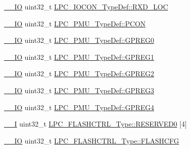 \begin{DoxyCompactItemize}
\item 
\hyperlink{group___c_m_s_i_s__core__definitions_gaec43007d9998a0a0e01faede4133d6be}{\+\_\+\+\_\+\+IO} uint32\+\_\+t \hyperlink{group___l_p_c11xx___definitions_ga8ec4275fda741de5194ccd27dcb0cb22}{L\+P\+C\+\_\+\+I\+O\+C\+O\+N\+\_\+\+Type\+Def\+::\+R\+X\+D\+\_\+\+L\+OC}
\item 
\hyperlink{group___c_m_s_i_s__core__definitions_gaec43007d9998a0a0e01faede4133d6be}{\+\_\+\+\_\+\+IO} uint32\+\_\+t \hyperlink{group___l_p_c11xx___definitions_gace88fd565967e0b8a698ed05aa6a08f9}{L\+P\+C\+\_\+\+P\+M\+U\+\_\+\+Type\+Def\+::\+P\+C\+ON}
\item 
\hyperlink{group___c_m_s_i_s__core__definitions_gaec43007d9998a0a0e01faede4133d6be}{\+\_\+\+\_\+\+IO} uint32\+\_\+t \hyperlink{group___l_p_c11xx___definitions_ga8aa25492f1cc07e7dd2a3458cb1bb466}{L\+P\+C\+\_\+\+P\+M\+U\+\_\+\+Type\+Def\+::\+G\+P\+R\+E\+G0}
\item 
\hyperlink{group___c_m_s_i_s__core__definitions_gaec43007d9998a0a0e01faede4133d6be}{\+\_\+\+\_\+\+IO} uint32\+\_\+t \hyperlink{group___l_p_c11xx___definitions_gae1077907bc2cb229a78dd4349de107f7}{L\+P\+C\+\_\+\+P\+M\+U\+\_\+\+Type\+Def\+::\+G\+P\+R\+E\+G1}
\item 
\hyperlink{group___c_m_s_i_s__core__definitions_gaec43007d9998a0a0e01faede4133d6be}{\+\_\+\+\_\+\+IO} uint32\+\_\+t \hyperlink{group___l_p_c11xx___definitions_ga56d0d66c3216217926792c465ba59557}{L\+P\+C\+\_\+\+P\+M\+U\+\_\+\+Type\+Def\+::\+G\+P\+R\+E\+G2}
\item 
\hyperlink{group___c_m_s_i_s__core__definitions_gaec43007d9998a0a0e01faede4133d6be}{\+\_\+\+\_\+\+IO} uint32\+\_\+t \hyperlink{group___l_p_c11xx___definitions_ga8206f79423746cfc3789c0a039139e02}{L\+P\+C\+\_\+\+P\+M\+U\+\_\+\+Type\+Def\+::\+G\+P\+R\+E\+G3}
\item 
\hyperlink{group___c_m_s_i_s__core__definitions_gaec43007d9998a0a0e01faede4133d6be}{\+\_\+\+\_\+\+IO} uint32\+\_\+t \hyperlink{group___l_p_c11xx___definitions_ga1232f5a7193adf2f2e5b1fd6ec943889}{L\+P\+C\+\_\+\+P\+M\+U\+\_\+\+Type\+Def\+::\+G\+P\+R\+E\+G4}
\item 
\hyperlink{group___c_m_s_i_s__core__definitions_gaf63697ed9952cc71e1225efe205f6cd3}{\+\_\+\+\_\+I} uint32\+\_\+t \hyperlink{group___l_p_c11xx___definitions_ga1e76ff992a53b6f0d322ba31ceed23a1}{L\+P\+C\+\_\+\+F\+L\+A\+S\+H\+C\+T\+R\+L\+\_\+\+Type\+::\+R\+E\+S\+E\+R\+V\+E\+D0} \mbox{[}4\mbox{]}
\item 
\hyperlink{group___c_m_s_i_s__core__definitions_gaec43007d9998a0a0e01faede4133d6be}{\+\_\+\+\_\+\+IO} uint32\+\_\+t \hyperlink{group___l_p_c11xx___definitions_ga935218d47a7a49f946adf9eab4c879f8}{L\+P\+C\+\_\+\+F\+L\+A\+S\+H\+C\+T\+R\+L\+\_\+\+Type\+::\+F\+L\+A\+S\+H\+C\+FG}

\end{DoxyCompactItemize}
